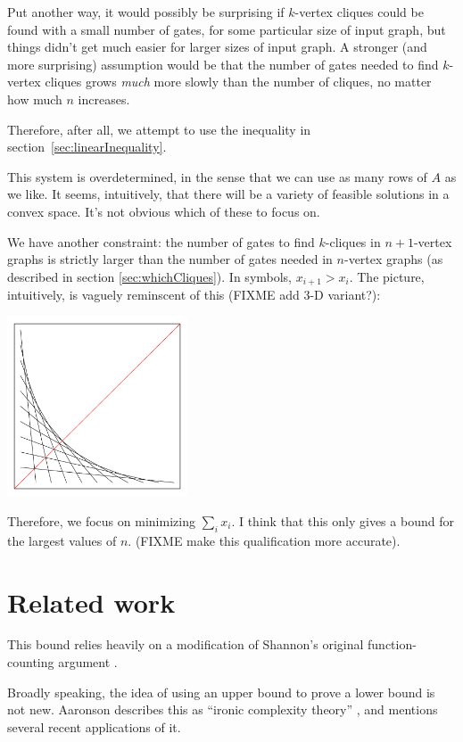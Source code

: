\documentclass[12pt]{article}
\theoremstyle{definition}
\begin{document}
Put another way, it would possibly be surprising if $k$-vertex
cliques could be found with a small number of gates, for some particular
size of input graph, but things didn't get much easier for
larger sizes of input graph.
A stronger (and more surprising) assumption would be that the
number of gates needed to find $k$-vertex cliques grows {\em much} more
slowly than the number of cliques, no matter how much $n$ increases.

Therefore, after all, we attempt to use the inequality in
section~\ref{sec:linearInequality}.

This system is overdetermined, in the sense that we can use as
many rows of $A$ as we like. It seems, intuitively,
that there will be a variety of feasible solutions in a convex space.
It's not obvious which of these to focus on.

We have another constraint: the number of gates to find $k$-cliques
in $n+1$-vertex graphs is strictly larger than the number of gates
needed in $n$-vertex graphs (as described in section 
\ref{sec:whichCliques}). In symbols, $x_{i+1} > x_i$.
The picture, intuitively, is vaguely reminscent of this (FIXME add
3-D variant?): 

\includegraphics[width=0.4\textwidth]{R/mesh2D.pdf}

Therefore, we focus on minimizing $\sum_i x_i$. I think that this
only gives a bound for the largest values of $n$. (FIXME 
make this qualification more accurate).

\section{Related work}

This bound relies heavily on a modification of Shannon's original
function-counting argument \cite{shannon_synthesis_1949}.

Broadly speaking, the idea of using an upper bound to prove a lower bound
is not new. Aaronson describes this as ``ironic complexity theory''
\cite{aaronson_pnp}, and mentions several recent applications of it.
\end{document}
